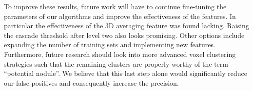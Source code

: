 To improve these results, future work will have to continue fine-tuning the
parameters of our algorithms and improve the effectiveness of the features. In
particular the effectiveness of the 3D averaging feature was found lacking.
Raising the cascade threshold after level two also looks promising. Other
options include expanding the number of training sets and implementing new
features. Furthermore, future research should look into more advanced voxel
clustering strategies such that the remaining clusters are properly worthy of
the term ``potential nodule''. We believe that this last step alone would
significantly reduce our false positives and consequently increase the
precision.

